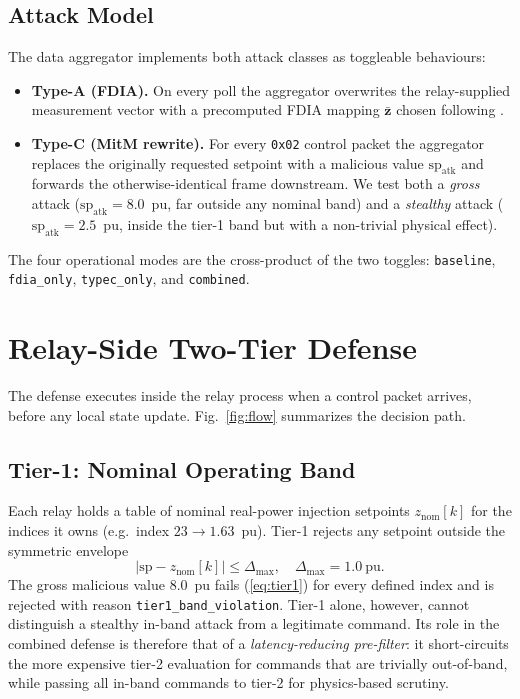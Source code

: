 \documentclass[conference]{IEEEtran}
\begin{document}
\subsection{Attack Model}
The data aggregator implements both attack classes as toggleable behaviours:
\begin{itemize}
\item \textbf{Type-A (FDIA).} On every poll the aggregator overwrites the relay-supplied measurement vector with a precomputed FDIA mapping $\bar{\mathbf{z}}$ chosen following \cite{liuFalseDataInjection}.
\item \textbf{Type-C (MitM rewrite).} For every \texttt{0x02} control packet the aggregator replaces the originally requested setpoint with a malicious value $\mathrm{sp}_{\mathrm{atk}}$ and forwards the otherwise-identical frame downstream. We test both a \emph{gross} attack ($\mathrm{sp}_{\mathrm{atk}}=8.0$~pu, far outside any nominal band) and a \emph{stealthy} attack ($\mathrm{sp}_{\mathrm{atk}}=2.5$~pu, inside the tier-1 band but with a non-trivial physical effect).
\end{itemize}
The four operational modes are the cross-product of the two toggles: \texttt{baseline}, \texttt{fdia\_only}, \texttt{typec\_only}, and \texttt{combined}.

\section{Relay-Side Two-Tier Defense}\label{sec:defense}
The defense executes inside the relay process when a control packet arrives, before any local state update. Fig.~\ref{fig:flow} summarizes the decision path.

\subsection{Tier-1: Nominal Operating Band}
Each relay holds a table of nominal real-power injection setpoints $z_{\mathrm{nom}}[k]$ for the indices it owns (e.g.\ index $23\!\to\!1.63$~pu). Tier-1 rejects any setpoint outside the symmetric envelope
\begin{equation}
\bigl|\mathrm{sp} - z_{\mathrm{nom}}[k]\bigr| \le \Delta_{\max}, \quad \Delta_{\max}=1.0~\text{pu}.
\label{eq:tier1}
\end{equation}
The gross malicious value 8.0~pu fails (\ref{eq:tier1}) for every defined index and is rejected with reason \texttt{tier1\_band\_violation}. Tier-1 alone, however, cannot distinguish a stealthy in-band attack from a legitimate command. Its role in the combined defense is therefore that of a \emph{latency-reducing pre-filter}: it short-circuits the more expensive tier-2 evaluation for commands that are trivially out-of-band, while passing all in-band commands to tier-2 for physics-based scrutiny.
\end{document}
